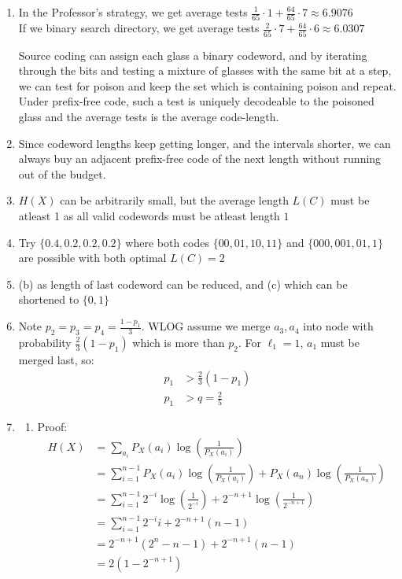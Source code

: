 \documentclass[12pt, a4paper]{article}
\begin{document}
\begin{enumerate}[Q\arabic*.]
  \item In the Professor's strategy, we get average tests $\frac{1}{65}\cdot 1 + \frac{64}{65} \cdot 7 \approx 6.9076$\\ 
    If we binary search directory, we get average tests $\frac{2}{65}\cdot 7 + \frac{64}{65}\cdot 6 \approx 6.0307$

    Source coding can assign each glass a binary codeword, and by iterating through the bits and testing a mixture of glasses with the same bit at a step, we can test for poison and keep the set which is containing poison and repeat. Under prefix-free code, such a test is uniquely decodeable to the poisoned glass and the average tests is the average code-length.

  \item Since codeword lengths keep getting longer, and the intervals shorter, we can always buy an adjacent prefix-free code of the next length without running out of the budget.  

  \item $H(X)$ can be arbitrarily small, but the average length $L(C)$ must be atleast 1 as all valid codewords must be atleast length $1$

  \item Try $\{0.4, 0.2, 0.2, 0.2\}$ where both codes $\{00, 01, 10, 11\}$ and $\{000, 001, 01, 1\}$ are possible with both optimal $L(C) = 2$ 

  \item (b) as length of last codeword can be reduced, and (c) which can be shortened to $\{0, 1\}$

  \item Note $p_2=p_3=p_4 = \frac{1-p_1}{3}$. WLOG assume we merge $a_3, a_4$ into node with probability $\frac{2}{3}(1-p_1)$ which is more than $p_2$. For $\ell_1 = 1$, $a_1$ must be merged last, so:
    \begin{align*}
      p_1 &> \frac{2}{3}(1-p_1)\\ 
      p_1 &> q = \frac{2}{5}
    \end{align*}

  \pagebreak
  \item 
    \begin{enumerate}
      \item Proof:
        \begin{align*}
          H(X) &= \sum_{a_i}P_X(a_i)\log(\frac{1}{P_X(a_i)})\\ 
               &= \sum^{n-1}_{i=1}P_X(a_i)\log(\frac{1}{P_X(a_i)}) + P_X(a_n)\log(\frac{1}{P_X(a_n)})\\ 
               &= \sum^{n-1}_{i=1}2^{-i}\log(\frac{1}{2^{-i}}) + 2^{-n+1}\log(\frac{1}{2^{-n+1}})\\ 
               &= \sum^{n-1}_{i=1}2^{-i}i + 2^{-n+1}(n-1)\\ 
               &= 2^{-n+1}(2^n-n-1)+2^{-n+1}(n-1)\\ 
               &= 2(1-2^{-n+1})
        \end{align*}


\end{enumerate}
\end{enumerate}
\end{document}
